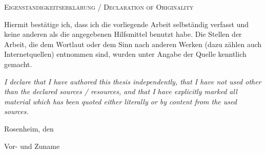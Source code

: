 {
\large
\thispagestyle{empty}
\vspace*{\fill}

\noindent
\textsc{Eigenständigkeitserklärung / Declaration of Originality}

\medskip

\noindent
Hiermit bestätige ich, dass ich die vorliegende Arbeit selbständig verfasst und keine anderen als die angegebenen Hilfsmittel benutzt habe. Die Stellen der Arbeit, die dem Wortlaut oder dem Sinn nach anderen Werken (dazu zählen auch Internetquellen) entnommen sind, wurden unter Angabe der Quelle kenntlich gemacht.

\medskip

\textit{I declare that I have authored this thesis independently, that I have not used other than the declared sources / resources, and that I have explicitly marked all material which has been quoted either literally or by content from the used sources.}

\bigskip

\noindent
Rosenheim, den 

\vspace*{2cm}

\noindent
Vor- und Zuname
}

